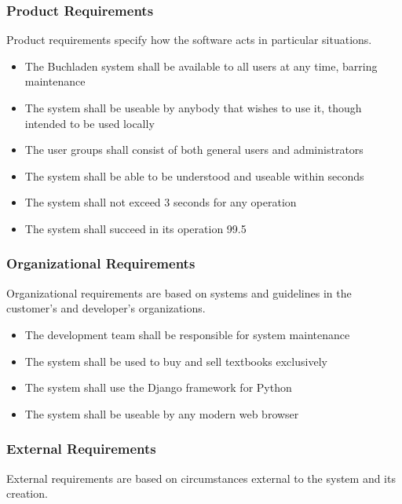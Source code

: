 \documentclass[11pt]{article}
\begin{document}
\subsubsection{Product Requirements}

Product requirements specify how the software acts in particular situations.

\begin{itemize}
\item The Buchladen system shall be available to all users at any time, barring maintenance
\item The system shall be useable by anybody that wishes to use it, though intended to be used locally
\item The user groups shall consist of both general users and administrators
\item The system shall be able to be understood and useable within seconds
\item The system shall not exceed 3 seconds for any operation
\item The system shall succeed in its operation 99.5%

\end{itemize}

\subsubsection{Organizational Requirements}

Organizational requirements are based on systems and guidelines in the customer’s and developer’s organizations.

\begin{itemize}
\item The development team shall be responsible for system maintenance
\item The system shall be used to buy and sell textbooks exclusively
\item The system shall use the Django framework for Python
\item The system shall be useable by any modern web browser
\end{itemize}


\subsubsection{External Requirements}

External requirements are based on circumstances external to the system and its creation.
\end{document}
